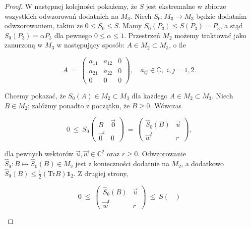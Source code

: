 {\begin{proof}
W następnej kolejności pokażemy, że $S$ jest ekstremalne
w zbiorze wszystkich odwzorowań dodatnich na $M_{3}$.
Niech $S_{0}: M_{3} \rightarrow M_{3}$ będzie dodatnim odwzorowaniem,
takim że
$0 \leq S_{0} \leq S$.
Mamy $S_{0}(P_{3}) \leq S(P_{3}) = P_{3}$,
a stąd $S_{0}(P_{3}) = \alpha P_{3}$ dla pewnego $0 \leq \alpha \leq 1$.
Przestrzeń $M_{2}$ możemy traktować jako zanurzoną w $M_{3}$
w następujący sposób:
$A \in M_{2} \! \subset \! M_{3}$, o ile
\begin{linenomath*}
 \begin{equation}
\label{RandomLabel:450031}
    A \: = \: \left( \begin{array}{ccc}
    a_{11} & a_{12} & 0 \\
    a_{21} & a_{22} & 0 \\
    0 & 0 & 0
    \end{array} \right), \quad
    a_{ij} \in \mathbb{C}, \,\, i,j = 1,2.
 \end{equation}
\end{linenomath*}
Chcemy pokazać, że $S_{0}(A) \in M_{2} \! \subset \! M_{3}$
dla każdego $A \in M_{2} \! \subset \! M_{3}$.
Niech $B \in M_{2}$; załóżmy ponadto z początku, że $B \geq 0$.
Wówczas
\begin{linenomath*}
 \begin{equation}
\label{eq:SMapsM2intoM2}
 0 \:\leq\: S_{0} \begin{pmatrix}
               B & \vec{0} \\ \vec{0}^{t} & 0
              \end{pmatrix} \: = \:
 \begin{pmatrix}
  \hat{S}_{0}(B) & \vec{u} \\ \vec{w}^{t} & r
 \end{pmatrix},
 \end{equation}
\end{linenomath*}
dla pewnych wektorów $\vec{u}, \vec{w} \in \mathbb{C}^{2}$ oraz $r \geq 0$.
Odwzorowanie $\hat{S}_{0}:B \mapsto \hat{S}_{0}(B) \in M_{2}$ jest
z konieczności dodatnie na $M_{2}$, a dodatkowo
$\hat{S}_{0}(B) \leq \frac{1}{2} (\text{Tr} B) \mathbf{1}_{2}$.
Z drugiej strony,
\begin{linenomath*}
 \begin{equation}
 0 \: \leq \:
 \begin{pmatrix}
  \hat{S}_{0}(B) & \vec{u} \\ \vec{w}^{t} & r
 \end{pmatrix} \: \leq \:
            S \begin{pmatrix}

\end{pmatrix}
\end{equation}
\end{linenomath*}
\end{proof}}
